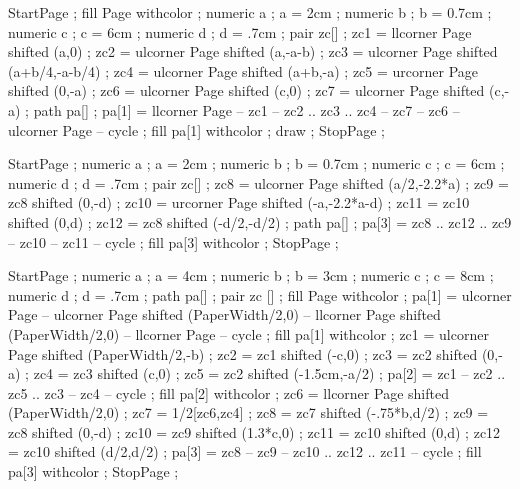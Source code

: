 
StartPage ;
fill Page withcolor  ;
numeric a ; a = 2cm ;
numeric b ; b = 0.7cm ;
numeric c ; c = 6cm ;
numeric d ; d = .7cm ;
pair zc[] ;
zc1 = llcorner Page shifted (a,0) ;
zc2 = ulcorner Page shifted (a,-a-b) ;
zc3 = ulcorner Page shifted (a+b/4,-a-b/4) ;
zc4 = ulcorner Page shifted (a+b,-a) ;
zc5 = urcorner Page shifted (0,-a) ;
zc6 = ulcorner Page shifted (c,0) ;
zc7 = ulcorner Page shifted (c,-a) ;
path pa[] ;
pa[1] = llcorner Page -- zc1 -- zc2 .. zc3 .. zc4 -- zc7 -- zc6 -- ulcorner Page -- cycle ;
fill pa[1] withcolor  ;
draw  ;
StopPage ;
\stopuseMPgraphic

StartPage ;
numeric a ; a = 2cm ;
numeric b ; b = 0.7cm ;
numeric c ; c = 6cm ;
numeric d ; d = .7cm ;
pair zc[] ;
zc8 = ulcorner Page shifted (a/2,-2.2*a) ;
zc9 = zc8 shifted (0,-d) ;
zc10 = urcorner Page shifted (-a,-2.2*a-d) ;
zc11 = zc10 shifted (0,d) ;
zc12 = zc8 shifted (-d/2,-d/2) ;
path pa[] ;
pa[3] = zc8 .. zc12 .. zc9 -- zc10 -- zc11 -- cycle ;
fill pa[3] withcolor  ;
StopPage ;
\stopuniqueMPgraphic

StartPage ;
numeric a ; a = 4cm ;
numeric b ; b = 3cm ;
numeric c ; c = 8cm ;
numeric d ; d = .7cm ;
path pa[] ;
pair zc [] ;
fill Page withcolor  ;
pa[1] = ulcorner Page -- ulcorner Page shifted (PaperWidth/2,0) -- llcorner Page shifted (PaperWidth/2,0) -- llcorner Page -- cycle ;
fill pa[1] withcolor  ;
zc1 = ulcorner Page shifted (PaperWidth/2,-b) ;
zc2 = zc1 shifted (-c,0) ;
zc3 = zc2 shifted (0,-a) ;
zc4 = zc3 shifted (c,0) ;
zc5 = zc2 shifted (-1.5cm,-a/2) ;
pa[2] = zc1 -- zc2 .. zc5 .. zc3 -- zc4 -- cycle ;
fill pa[2] withcolor  ;
zc6 = llcorner Page shifted (PaperWidth/2,0) ;
zc7 = 1/2[zc6,zc4] ;
zc8 = zc7 shifted (-.75*b,d/2) ;
zc9 = zc8 shifted (0,-d) ;
zc10 = zc9 shifted (1.3*c,0) ;
zc11 = zc10 shifted (0,d) ;
zc12 = zc10 shifted (d/2,d/2) ;
pa[3] = zc8 -- zc9 -- zc10 .. zc12 .. zc11 -- cycle ;
fill pa[3] withcolor  ;
StopPage ;
\stopuniqueMPgraphic


